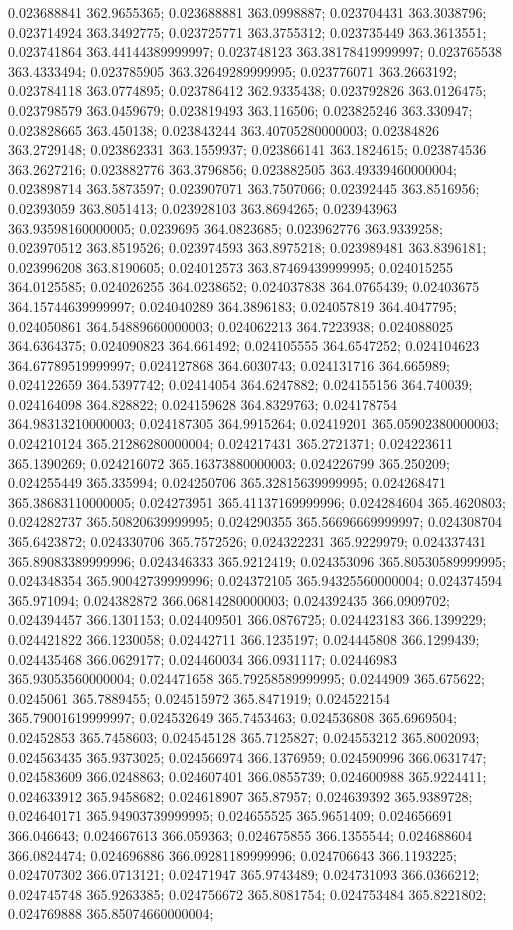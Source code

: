 0.023688841 362.9655365; 0.023688881 363.0998887; 0.023704431 363.3038796; 0.023714924 363.3492775; 0.023725771 363.3755312; 0.023735449 363.3613551; 0.023741864 363.44144389999997; 0.023748123 363.38178419999997; 0.023765538 363.4333494; 0.023785905 363.32649289999995; 0.023776071 363.2663192; 0.023784118 363.0774895; 0.023786412 362.9335438; 0.023792826 363.0126475; 0.023798579 363.0459679; 0.023819493 363.116506; 0.023825246 363.330947; 0.023828665 363.450138; 0.023843244 363.40705280000003; 0.02384826 363.2729148; 0.023862331 363.1559937; 0.023866141 363.1824615; 0.023874536 363.2627216; 0.023882776 363.3796856; 0.023882505 363.49339460000004; 0.023898714 363.5873597; 0.023907071 363.7507066; 0.02392445 363.8516956; 0.02393059 363.8051413; 0.023928103 363.8694265; 0.023943963 363.93598160000005; 0.0239695 364.0823685; 0.023962776 363.9339258; 0.023970512 363.8519526; 0.023974593 363.8975218; 0.023989481 363.8396181; 0.023996208 363.8190605; 0.024012573 363.87469439999995; 0.024015255 364.0125585; 0.024026255 364.0238652; 0.024037838 364.0765439; 0.02403675 364.15744639999997; 0.024040289 364.3896183; 0.024057819 364.4047795; 0.024050861 364.54889660000003; 0.024062213 364.7223938; 0.024088025 364.6364375; 0.024090823 364.661492; 0.024105555 364.6547252; 0.024104623 364.67789519999997; 0.024127868 364.6030743; 0.024131716 364.665989; 0.024122659 364.5397742; 0.02414054 364.6247882; 0.024155156 364.740039; 0.024164098 364.828822; 0.024159628 364.8329763; 0.024178754 364.98313210000003; 0.024187305 364.9915264; 0.02419201 365.05902380000003; 0.024210124 365.21286280000004; 0.024217431 365.2721371; 0.024223611 365.1390269; 0.024216072 365.16373880000003; 0.024226799 365.250209; 0.024255449 365.335994; 0.024250706 365.32815639999995; 0.024268471 365.38683110000005; 0.024273951 365.41137169999996; 0.024284604 365.4620803; 0.024282737 365.50820639999995; 0.024290355 365.56696669999997; 0.024308704 365.6423872; 0.024330706 365.7572526; 0.024322231 365.9229979; 0.024337431 365.89083389999996; 0.024346333 365.9212419; 0.024353096 365.80530589999995; 0.024348354 365.90042739999996; 0.024372105 365.94325560000004; 0.024374594 365.971094; 0.024382872 366.06814280000003; 0.024392435 366.0909702; 0.024394457 366.1301153; 0.024409501 366.0876725; 0.024423183 366.1399229; 0.024421822 366.1230058; 0.02442711 366.1235197; 0.024445808 366.1299439; 0.024435468 366.0629177; 0.024460034 366.0931117; 0.02446983 365.93053560000004; 0.024471658 365.79258589999995; 0.0244909 365.675622; 0.0245061 365.7889455; 0.024515972 365.8471919; 0.024522154 365.79001619999997; 0.024532649 365.7453463; 0.024536808 365.6969504; 0.02452853 365.7458603; 0.024545128 365.7125827; 0.024553212 365.8002093; 0.024563435 365.9373025; 0.024566974 366.1376959; 0.024590996 366.0631747; 0.024583609 366.0248863; 0.024607401 366.0855739; 0.024600988 365.9224411; 0.024633912 365.9458682; 0.024618907 365.87957; 0.024639392 365.9389728; 0.024640171 365.94903739999995; 0.024655525 365.9651409; 0.024656691 366.046643; 0.024667613 366.059363; 0.024675855 366.1355544; 0.024688604 366.0824474; 0.024696886 366.09281189999996; 0.024706643 366.1193225; 0.024707302 366.0713121; 0.02471947 365.9743489; 0.024731093 366.0366212; 0.024745748 365.9263385; 0.024756672 365.8081754; 0.024753484 365.8221802; 0.024769888 365.85074660000004; 